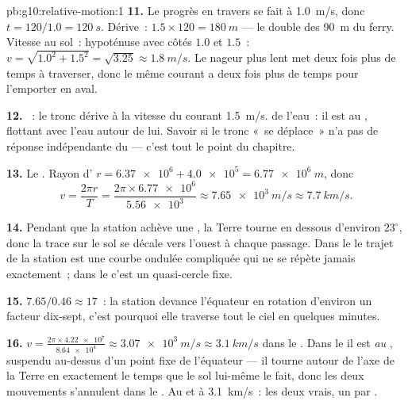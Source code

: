 \begin{solution}{pb:g10:relative-motion:1}
\textbf{11.} Le progrès en travers se fait à \qty{1.0}{m/s}, donc
$t = 120/1.0 = \qty{120}{s}$. Dérive~: $1.5 \times 120 = \qty{180}{m}$
--- le double des \qty{90}{m} du ferry. Vitesse au sol~: hypoténuse
avec côtés $1.0$ et $1.5$~: $v = \sqrt{1.0^2 + 1.5^2} = \sqrt{3.25}
\approx \qty{1.8}{m/s}$. Le nageur plus lent met deux fois plus de
temps à traverser, donc le même courant a deux fois plus de temps pour
l'emporter en aval.

\textbf{12.} ~: le tronc dérive à la vitesse du
courant \qty{1.5}{m/s}.  de l'eau~: il est au
, flottant avec l'eau autour de lui. Savoir si le tronc
«~se déplace~» n'a pas de réponse indépendante du  ---
c'est tout le point du chapitre.

\textbf{13.} Le . Rayon d'
$r = \num{6.37e6} + \num{4.0e5} = \qty{6.77e6}{m}$, donc
\[
v = \frac{2\pi r}{T} = \frac{2\pi \times \num{6.77e6}}{\num{5.56e3}}
\approx \qty{7.65e3}{m/s} \approx \qty{7.7}{km/s}.
\]

\textbf{14.} Pendant que la station achève une
, la Terre tourne en dessous d'environ
$23^\circ$, donc la trace sur le sol se décale vers l'ouest à chaque
passage. Dans le  le trajet de la station
est une courbe ondulée compliquée qui ne se répète jamais exactement~;
dans le  c'est un quasi-cercle fixe.

\textbf{15.} $7.65 / 0.46 \approx 17$~: la station devance l'équateur
en rotation d'environ un facteur dix-sept, c'est pourquoi elle traverse
tout le ciel en quelques minutes.

\textbf{16.} $v = \frac{2\pi \times \num{4.22e7}}{\num{8.64e4}}
\approx \qty{3.07e3}{m/s} \approx \qty{3.1}{km/s}$ dans le
. Dans le
 il est \emph{au
}, suspendu au-dessus d'un point fixe de l'équateur ---
il tourne autour de l'axe de la Terre en exactement le temps que le
sol lui-même le fait, donc les deux mouvements s'annulent dans le
. Au  et à
\qty{3.1}{km/s}~: les deux vrais, un par .


\end{solution}
